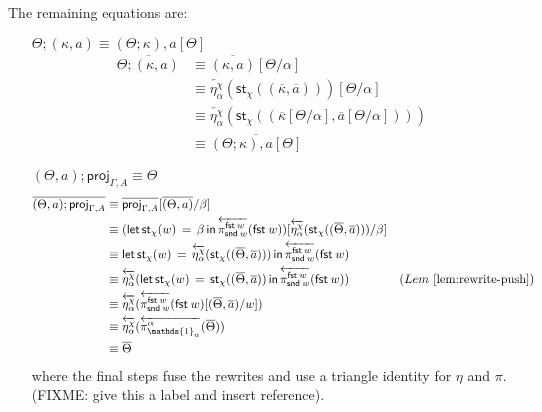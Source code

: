 \documentclass[10pt]{article}
\theoremstyle{definition}
\newcommand\dsd[1]{\ensuremath{\mathsf{#1}}}
\newcommand{\app}[2]{\ensuremath{#1 \: #2}}
\newcommand{\fst}[1]{\app{\dsd{fst}}{#1}}
\newcommand{\snd}[1]{\app{\dsd{snd}}{#1}}
\newcommand{\rewrite}[2]{\overleftarrow{#1}(#2)}
\newcommand\StI[2]{\ensuremath{\mathsf{st}_{#1}(#2)}}
\newcommand\StE[4]{\ensuremath{\mathsf{let} \, \StI{#1}{#3} \, = \, {#2} \, \mathsf{in} \, #4}}
\newcommand{\upstairs}[1]{\overline{#1}}
\newcommand\proj[1]{\ensuremath{\mathsf{proj}_{#1}}}
\newcommand\One{\ensuremath{\mathds{1}}}
\begin{document}
The remaining equations are:

\begin{enumerate}[style = multiline, labelwidth = 80pt]
\item[{$\Theta ; (\kappa , a) \equiv (\Theta ; \kappa) , a[\Theta]$}] 
\begin{align*}
\upstairs{\Theta ; (\kappa , a)}
&\equiv \upstairs{(\kappa, a)}[\Theta/\alpha] \\
&\equiv \rewrite{\eta^\chi_{\alpha}}{\StI{\chi}{(\upstairs{\kappa}, \upstairs{a})}}[\Theta/\alpha] \\
&\equiv \rewrite{\eta^\chi_{\alpha}}{\StI{\chi}{(\upstairs{\kappa}[\Theta/\alpha], \upstairs{a}[\Theta/\alpha])}} \\
&\equiv \upstairs{(\Theta ; \kappa) , a[\Theta]}
\end{align*}

\item[{$(\Theta, a);\proj{\Gamma,A} \equiv \Theta$}]
\begin{align*}
\upstairs{(\Theta, a);\proj{\Gamma,A}}
&\equiv \upstairs{\proj{\Gamma,A}}[\upstairs{(\Theta, a)}/\beta] \\
&\equiv (\StE{\chi}{\beta}{w}{\rewrite{\pi^{\fst w}_{\snd w}}{\fst w}})[\rewrite{\eta^\chi_{\alpha}}{\StI{\chi}{(\upstairs{\Theta}, \upstairs{a})}}/\beta] \\
&\equiv \StE{\chi}{\rewrite{\eta^\chi_{\alpha}}{\StI{\chi}{(\upstairs{\Theta}, \upstairs{a})}}}{w}{\rewrite{\pi^{\fst w}_{\snd w}}{\fst w}} \\
&\equiv \rewrite{\eta^\chi_{\alpha}}{\StE{\chi}{\StI{\chi}{(\upstairs{\Theta}, \upstairs{a})}}{w}{\rewrite{\pi^{\fst w}_{\snd w}}{\fst w}}} & (Lem~\ref{lem:rewrite-push})\\
&\equiv \rewrite{\eta^\chi_{\alpha}}{\rewrite{\pi^{\fst w}_{\snd w}}{\fst w}[(\upstairs{\Theta}, \upstairs{a})/w]} \\
&\equiv \rewrite{\eta^\chi_{\alpha}}{\rewrite{\pi^\alpha_{\One_\alpha}}{\upstairs{\Theta}}} \\
&\equiv\upstairs{\Theta} 
\end{align*}
where the final steps fuse the rewrites and use a triangle identity for $\eta$ and $\pi$.  (FIXME: give this a label and insert reference).  


\end{enumerate}
\end{document}
